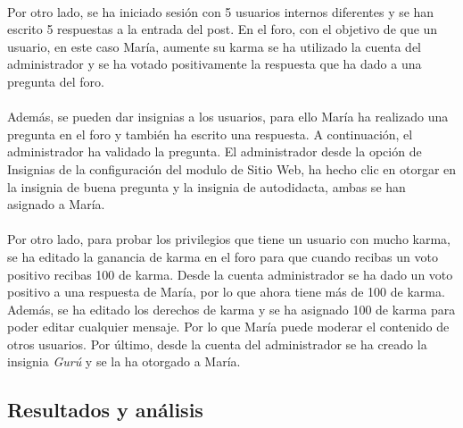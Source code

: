 \paragraph{}
Por otro lado, se ha iniciado sesión con 5 usuarios internos diferentes y se han escrito 5 respuestas a la entrada del post. En el foro, con el objetivo de que un usuario, en este caso María, aumente su karma se ha utilizado la cuenta del administrador y se ha votado positivamente la respuesta que ha dado a una pregunta del foro. 
\paragraph{}
Además, se pueden dar insignias a los usuarios, para ello María ha realizado una pregunta en el foro y también ha escrito una respuesta. A continuación, el administrador ha validado la pregunta. El administrador desde la opción de Insignias de la configuración del modulo de Sitio Web, ha hecho clic en otorgar en la insignia de buena pregunta y la insignia de autodidacta, ambas se han asignado a María. 
\paragraph{}
Por otro lado, para probar los privilegios que tiene un usuario con mucho karma, se ha editado la ganancia de karma en el foro para que cuando recibas un voto positivo recibas 100 de karma. Desde la cuenta administrador se ha dado un voto positivo a una respuesta de María, por lo que ahora tiene más de 100 de karma. Además, se ha editado los derechos de karma y se ha asignado 100 de karma para poder editar cualquier mensaje. Por lo que María puede moderar el contenido de otros usuarios. Por último, desde la cuenta del administrador se ha creado la insignia \textit{Gurú} y se la ha otorgado a María. 
\subsection{Resultados y análisis}
